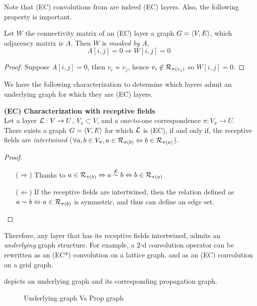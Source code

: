 Note that (EC) convolutions from  are indeed (EC) layers. Also, the following property is important.

\begin{proposition}Let $W$ the connectivity matrix of an (EC) layer \wrt a graph $G = \langle V, E \rangle$, which adjacency matrix is $A$. Then $W$ is \emph{masked by} $A$, \ie
$$
A[i,j] = 0 \Rightarrow W[i,j] = 0
$$
\label{prop:aw}
\end{proposition}
\begin{proof}
Suppose $A[i,j] = 0$, then $v_i \nsim v_j$, hence $v_i \notin \mathcal{R}_{\pi(v_j)}$ so $W[i,j] = 0$.
\end{proof}

We have the following characterization to determine which layers admit an underlying graph for which they are (EC) layers.

\begin{proposition}\textbf{(EC) Characterization with receptive fields}\\
Let a layer $\mathcal{L}: V \rightarrow U$, $V_\pi \subset V$, and a one-to-one correspondence $\pi: V_\pi \rightarrow U$. There exists a graph $G = \langle V, E \rangle$ for which $\mathcal{L}$ is (EC), if and only if, the receptive fields are \emph{intertwined} (\ie $\forall a,b \in V_\pi, a \in \mathcal{R}_{\pi(b)} \Leftrightarrow b \in \mathcal{R}_{\pi(a)} $).
\label{prop:lrf}
\end{proposition}
\begin{proof}
\begin{enumerate}
  \item[($\Rightarrow$)] Thanks to $a \in \mathcal{R}_{\pi(b)} \Leftrightarrow a \overset{E}\sim b \Leftrightarrow b \in \mathcal{R}_{\pi(a)}$
  \item[($\Leftarrow$)] If the receptive fields are intertwined, then the relation defined as\\ $a \sim b \Leftrightarrow a \in \mathcal{R}_{\pi(b)}$ is symmetric, and thus can define an edge set.
\end{enumerate}
\end{proof}

Therefore, any layer that has its receptive fields intertwined, admits an \emph{underlying} graph structure. For example, a $2$-d convolution operator can be rewritten as an (EC*) convolution on a lattice graph, and as an (EC) convolution on a grid graph.

 depicts an underlying graph and its corresponding propagation graph.

\begin{figure}[H]
\centering
{}
\caption{Underlying graph Vs Prop graph}
\label{fig:upgraph}
\end{figure}

